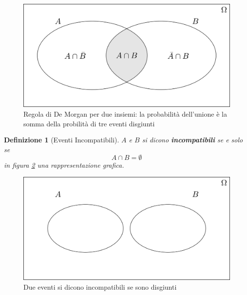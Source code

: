\documentclass[
  11pt,
]{book}
\theoremstyle{mytheoremstyle}
\theoremstyle{mydefstyle}
\newtheorem{definition}{Definizione}[section]
\begin{document}
\begin{figure}[H]

{\centering \includegraphics[width=41.67in,height=0.2\textheight,]{img/demorgan} 

}

\caption{Regola di De Morgan per due insiemi: la probabilità dell'unione è la somma della probilità di tre eventi disgiunti}\label{fig:demorgan}
\end{figure}

\begin{info}

\begin{definition}[Eventi Incompatibili]
\(A\) e \(B\) si dicono \textbf{incompatibili} se e solo se
\[A\cap B = \emptyset\] in figura \ref{fig:incomp} una rappresentazione
grafica.
\end{definition}

\end{info}

\begin{figure}[H]

{\centering \includegraphics[width=41.67in,height=0.2\textheight,]{img/disgiunto} 

}

\caption{Due eventi si dicono incompatibili se sono disgiunti}\label{fig:incomp}
\end{figure}
\end{document}
